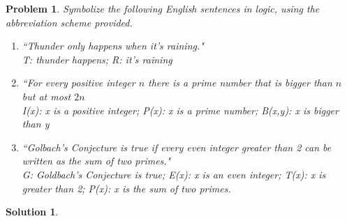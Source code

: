 \documentclass{article}
\newtheorem{problem}{Problem}
\theoremstyle{definition}
\newtheorem*{solution}{Solution}
\begin{document}
\begin{problem}
Symbolize the following English sentences in logic, using the abbreviation scheme provided.
\begin{enumerate}[label = \alph*)]
    \item ``Thunder only happens when it's raining." \\
    T: thunder happens; R: it's raining
    
    \item ``For every positive integer $n$ there is a prime number that is bigger than $n$ but at most $2n$ \\
    I(x): x is a positive integer; P(x): x is a prime number; B(x,y): x is bigger than y
    
    \item ``Golbach's Conjecture is true if every even integer greater than 2 can be written as the sum of two primes." \\
    G: Goldbach's Conjecture is true; E(x): x is an even integer; T(x): x is greater than 2; P(x): x is the sum of two primes.
\end{enumerate}
\end{problem}

\begin{solution}
\end{solution}
\end{document}
